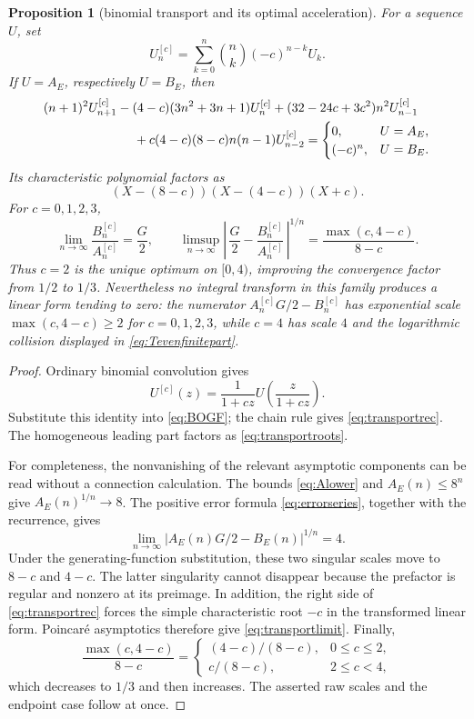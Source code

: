 \documentclass[11pt]{article}
\newtheorem{proposition}[theorem]{Proposition}
\theoremstyle{definition}
\theoremstyle{remark}
\begin{document}
\begin{proposition}[binomial transport and its optimal acceleration]\label{prop:bintransport}
For a sequence $U$, set
\[
 U_n^{[c]}=\sum_{k=0}^n\binom nk(-c)^{n-k}U_k.
\]
If $U=A_E$, respectively $U=B_E$, then
\begin{align}\label{eq:transportrec}
 &(n+1)^2U_{n+1}^{[c]}
 -(4-c)(3n^2+3n+1)U_n^{[c]}
 +(32-24c+3c^2)n^2U_{n-1}^{[c]}\notag\\
 &\hspace{25mm}
 +c(4-c)(8-c)n(n-1)U_{n-2}^{[c]}
 =\begin{cases}0,&U=A_E,\\(-c)^n,&U=B_E.\end{cases}
\end{align}
Its characteristic polynomial factors as
\begin{equation}\label{eq:transportroots}
 (X-(8-c))(X-(4-c))(X+c).
\end{equation}
For $c=0,1,2,3$,
\begin{equation}\label{eq:transportlimit}
 \lim_{n\to\infty}\frac{B_n^{[c]}}{A_n^{[c]}}=\frac G2,\qquad
 \limsup_{n\to\infty}
 \left|\,\frac G2-\frac{B_n^{[c]}}{A_n^{[c]}}\,\right|^{1/n}
 =\frac{\max(c,4-c)}{8-c}.
\end{equation}
Thus $c=2$ is the unique optimum on $[0,4)$, improving the convergence factor from
$1/2$ to $1/3$.  Nevertheless no integral transform in this family produces a
linear form tending to zero: the numerator
$A_n^{[c]}G/2-B_n^{[c]}$ has exponential scale
$\max(c,4-c)\ge2$ for $c=0,1,2,3$, while $c=4$ has scale $4$ and the logarithmic
collision displayed in \eqref{eq:Tevenfinitepart}.
\end{proposition}

\begin{proof}
Ordinary binomial convolution gives
\[
 U^{[c]}(z)=\frac1{1+cz}U\!\left(\frac z{1+cz}\right).
\]
Substitute this identity into \eqref{eq:BOGF}; the chain rule gives
\eqref{eq:transportrec}.  The homogeneous leading part factors as
\eqref{eq:transportroots}.

For completeness, the nonvanishing of the relevant asymptotic components can be read
without a connection calculation.  The bounds \eqref{eq:Alower} and
$A_E(n)\le8^n$ give $A_E(n)^{1/n}\to8$.  The positive error formula
\eqref{eq:errorseries}, together with the recurrence, gives
\[
 \lim_{n\to\infty}|A_E(n)G/2-B_E(n)|^{1/n}=4.
\]
Under the generating-function substitution, these two singular scales move to
$8-c$ and $4-c$.  The latter singularity cannot disappear because the prefactor is
regular and nonzero at its preimage.  In addition, the right side of
\eqref{eq:transportrec} forces the simple characteristic root $-c$ in the transformed
linear form.  Poincar\'e asymptotics therefore give \eqref{eq:transportlimit}.
Finally,
\[
 \frac{\max(c,4-c)}{8-c}=
 \begin{cases}(4-c)/(8-c),&0\le c\le2,\\
 c/(8-c),&2\le c<4,\end{cases}
\]
which decreases to $1/3$ and then increases.  The asserted raw scales and the endpoint
case follow at once.
\end{proof}
\end{document}
